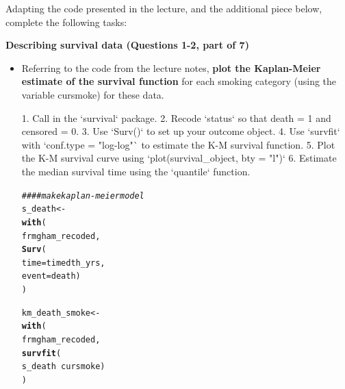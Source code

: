 \documentclass{article}\usepackage[]{graphicx}\usepackage[]{color}
\makeatletter
\newcommand{\hlcom}[1]{\textcolor[rgb]{0.678,0.584,0.686}{\textit{#1}}}%
\newcommand{\hlopt}[1]{\textcolor[rgb]{0,0,0}{#1}}%
\newcommand{\hlstd}[1]{\textcolor[rgb]{0.345,0.345,0.345}{#1}}%
\newcommand{\hlkwb}[1]{\textcolor[rgb]{0.69,0.353,0.396}{#1}}%
\newcommand{\hlkwc}[1]{\textcolor[rgb]{0.333,0.667,0.333}{#1}}%
\newcommand{\hlkwd}[1]{\textcolor[rgb]{0.737,0.353,0.396}{\textbf{#1}}}%
\newenvironment{kframe}{%
 \def\at@end@of@kframe{}%
 \ifinner\ifhmode%
  \def\at@end@of@kframe{\end{minipage}}%
  \begin{minipage}{\columnwidth}%
 \fi\fi%
 \def\FrameCommand##1{\hskip\@totalleftmargin \hskip-\fboxsep
 \colorbox{shadecolor}{##1}\hskip-\fboxsep
     \hskip-\linewidth \hskip-\@totalleftmargin \hskip\columnwidth}%
 \MakeFramed {\advance\hsize-\width
   \@totalleftmargin\z@ \linewidth\hsize
   \@setminipage}}%
 {\par\unskip\endMakeFramed%
 \at@end@of@kframe}
\newenvironment{knitrout}{}{} %
\makeatother
\begin{document}
Adapting the code presented in the lecture, and the additional piece below, complete the following tasks:

\vspace{2mm}

\textbf{Describing survival data (Questions 1-2, part of 7)}

\begin{itemize}
  \item Referring to the code from the lecture notes, \textbf{plot the Kaplan-Meier estimate of the survival function} for each smoking category (using the variable cursmoke) for these data.
  
1. Call in the `survival` package.   
2. Recode `status` so that death = 1 and censored = 0.   
3. Use `Surv()` to set up your outcome object.   
4. Use `survfit` with `conf.type = "log-log"` to estimate the K-M survival function.   
5. Plot the K-M survival curve using `plot(survival_object, bty = "l")`   
6. Estimate the median survival time using the `quantile` function.   
  
\begin{knitrout}
\color{fgcolor}\begin{kframe}
\begin{alltt}
\hlcom{#### make kaplan-meier model}
\hlstd{s_death} \hlkwb{<-}
  \hlkwd{with}\hlstd{(}
    \hlstd{frmgham_recoded,}
    \hlkwd{Surv}\hlstd{(}
      \hlkwc{time} \hlstd{= timedth_yrs,}
      \hlkwc{event} \hlstd{= death)}
    \hlstd{)}

\hlstd{km_death_smoke} \hlkwb{<-}
  \hlkwd{with}\hlstd{(}
    \hlstd{frmgham_recoded,}
    \hlkwd{survfit}\hlstd{(}
      \hlstd{s_death} \hlopt{~} \hlstd{cursmoke)}
    \hlstd{)}


\end{alltt}
\end{kframe}
\end{knitrout}
\end{itemize}
\end{document}
